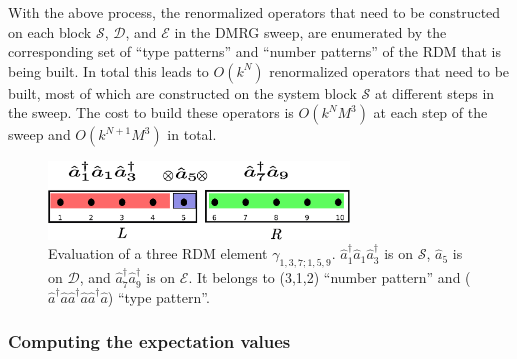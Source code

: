 
With the above process, the renormalized operators that need to be constructed   on each block $\mathcal{S}$, $\mathcal{D}$, and $\mathcal{E}$ 
in the DMRG sweep, are enumerated
by the corresponding set of ``type patterns'' and ``number patterns'' of the RDM that is being built. In total this leads to $O(k^N)$ renormalized
operators that need to be built, most of which are constructed on the system block $\mathcal{S}$ at different steps in the sweep. The cost to build these operators 
is $O(k^NM^3)$ at each step of the sweep and $O(k^{N+1}M^3)$ in total.   

\begin{figure}\label{fig:operator_split}
  \includegraphics[width=8cm]{operator_split.eps}
  \caption{Evaluation of a three RDM element $\gamma_{1,3,7;1,5,9}$. $\hat{a}_1^\dagger\hat{a}_1\hat{a}^\dagger_3$ is on $\mathcal{S}$, $\hat{a}_5$ is on $\mathcal{D}$, and $\hat{a}^\dagger_7\hat{a}^\dagger_9$ is on $\mathcal{E}$. It belongs to (3,1,2) ``number pattern'' and ($\hat{a}^\dagger\hat{a}\hat{a}^\dagger\hat{a}\hat{a}^\dagger\hat{a}$) ``type pattern''.}
\end{figure}

\subsubsection{Computing the expectation values}

